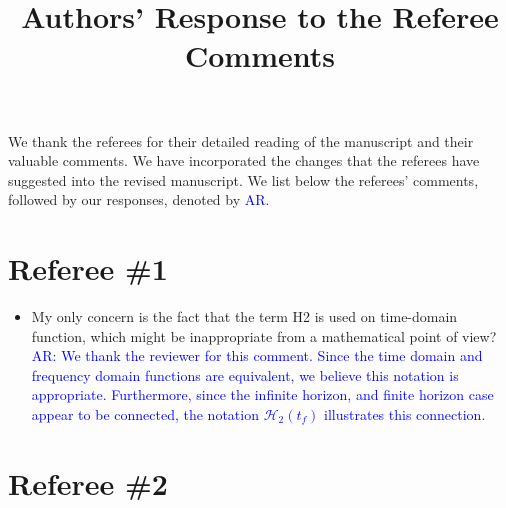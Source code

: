 \documentclass[11pt]{article}
\title{Authors' Response to the Referee Comments}
\author{}
\date{}
\def\serkan#1{\textcolor{blue}{{#1}}}
\begin{document}
\maketitle

We thank the referees {for their detailed reading of the manuscript and their valuable comments}.
 We have incorporated the changes that the referees have suggested into the revised
manuscript.   We list below the referees' comments, followed by our responses, denoted by \serkan{\textsf{AR}}.  

\section*{Referee \#1}%

\begin{itemize}
\item My only concern is the fact that the term H2 is used on time-domain
function, which might be inappropriate from a mathematical point of
view?\\
\serkan{\textsf{AR}: We thank the reviewer for this comment. Since the time domain and frequency domain functions are equivalent, we believe this notation is appropriate. Furthermore, since the infinite horizon, and finite horizon case appear to be connected, the notation $\mathcal{H}_2(t_f)$ illustrates this connection.}
\end{itemize}

\section*{Referee \#2}
\end{document}

